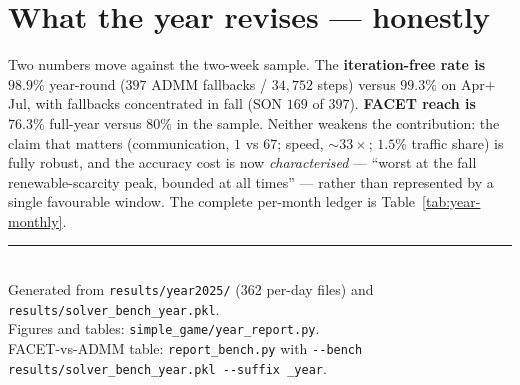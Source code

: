 \documentclass[11pt]{article}
\begin{document}


\section{What the year revises --- honestly}
Two numbers move against the two-week sample. The \textbf{iteration-free rate is $98.9\%$} year-round
($397$ ADMM fallbacks / $34{,}752$ steps) versus $99.3\%$ on Apr$+$Jul, with fallbacks concentrated in
fall (SON $169$ of $397$). \textbf{FACET reach is $76.3\%$} full-year versus $80\%$ in the sample. Neither
weakens the contribution: the claim that matters (communication, $1$ vs $67$; speed, $\sim\!33\times$;
$1.5\%$ traffic share) is fully robust, and the accuracy cost is now \emph{characterised} --- ``worst at
the fall renewable-scarcity peak, bounded at all times'' --- rather than represented by a single favourable
window. The complete per-month ledger is Table~\ref{tab:year-monthly}.



\vspace{1em}
\noindent\rule{\linewidth}{0.4pt}\\[2pt]
{\footnotesize\sloppy Generated from \texttt{results/year2025/} (362 per-day files) and
\texttt{results/\allowbreak solver\_bench\_\allowbreak year.pkl}.\\
Figures and tables: \texttt{simple\_game/year\_report.py}.\\
FACET-vs-ADMM table: \texttt{report\_bench.py} with \texttt{-{}-bench
results/\allowbreak solver\_bench\_\allowbreak year.pkl -{}-suffix \_year}.}
\end{document}
